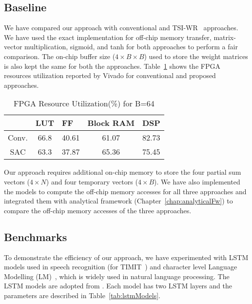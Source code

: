 \subsection{Baseline}
We have compared our approach with conventional and TSI-WR~\cite{park2020time} approaches. We have used the exact implementation for off-chip memory transfer, matrix-vector multiplication, sigmoid, and tanh for both approaches to perform a fair comparison. The on-chip buffer size ($4{\times}B{\times}B$) used to store the weight matrices is also kept the same for both the approaches. Table~\ref{tab:fpgaResources} shows the FPGA resources utilization reported by Vivado for conventional and proposed approaches. 
\begin{table}[htb]
	\centering
	\caption{FPGA Resource Utilization(\%) for B=64}
	\label{tab:fpgaResources}
	\begin{tabular}{@{}ccccl@{}}
		\toprule
		\multicolumn{1}{l}{} & \multicolumn{1}{l}{LUT} & \multicolumn{1}{l}{FF} & \multicolumn{1}{l}{Block RAM} & DSP   \\ \midrule
		Conv.                & 66.8                    & 40.61                  & 61.07                         & 82.73 \\ \midrule
		SAC                  & 63.3                    & 37.87                  & 65.36                         & 75.45 \\ \bottomrule
	\end{tabular}
\end{table}
Our approach requires additional on-chip memory to store the four partial sum vectors ($4{\times}N$) and four temporary vectors ($4{\times}B$).  We have also implemented the models to compute the off-chip memory accesses for all three approaches and integrated them with analytical framework (Chapter~\ref{chap:analyticalFw}) to compare the off-chip memory accesses of the three approaches.
\subsection{Benchmarks}
To demonstrate the efficiency of our approach, we have experimented with LSTM models used in speech recognition (for TIMIT~\cite{garofolo1993timit}) and character level Language Modelling (LM)~\cite{sundermeyer2015feedforward}, which is widely used in natural language processing. The LSTM models are adopted from \cite{azari2020elsa,park2018maximizing,han2017ese}. Each model has two LSTM layers and the parameters are described in Table~\ref{tab:lstmModels}.

